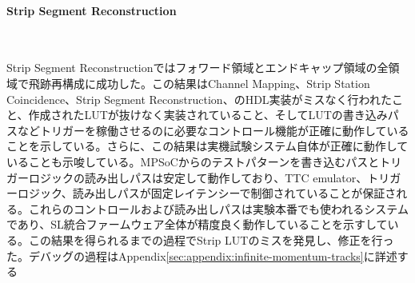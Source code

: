 \paragraph{Strip Segment Reconstruction}　　
\par 
Strip Segment Reconstructionではフォワード領域とエンドキャップ領域の全領域で飛跡再構成に成功した。この結果はChannel Mapping、Strip Station Coincidence、Strip Segment Reconstruction、のHDL実装がミスなく行われたこと、作成されたLUTが抜けなく実装されていること、そしてLUTの書き込みパスなどトリガーを稼働させるのに必要なコントロール機能が正確に動作していることを示している。さらに、この結果は実機試験システム自体が正確に動作していることも示唆している。MPSoCからのテストパターンを書き込むパスとトリガーロジックの読み出しパスは安定して動作しており、TTC emulator、トリガーロジック、読み出しパスが固定レイテンシーで制御されていることが保証される。これらのコントロールおよび読み出しパスは実験本番でも使われるシステムであり、SL統合ファームウェア全体が精度良く動作していることを示すしている。この結果を得られるまでの過程でStrip LUTのミスを発見し、修正を行った。デバッグの過程はAppendix\ref{sec:appendix:infinite-momentum-tracks}に詳述する

